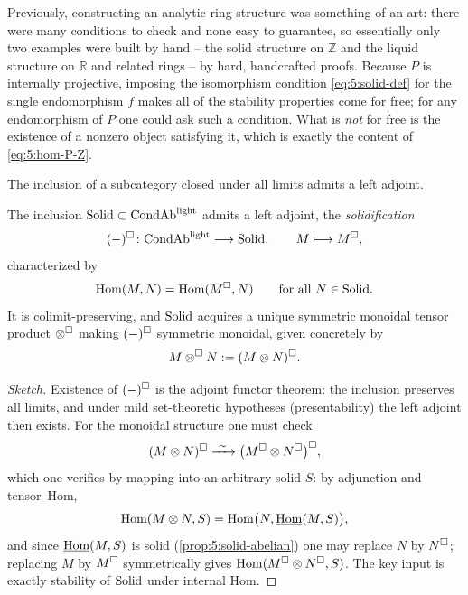 \begin{remark}
\label{rmk:5:for-free}
Previously, constructing an analytic ring structure was something of an art:
there were many conditions to check and none easy to guarantee, so essentially
only two examples were built by hand -- the solid structure on $\mathbb{Z}$ and
the liquid structure on $\mathbb{R}$ and related rings -- by hard, handcrafted
proofs. Because $P$ is internally projective, imposing the isomorphism condition
\eqref{eq:5:solid-def} for the single endomorphism $f$ makes all of the stability
properties come for free; for any endomorphism of $P$ one could ask such a
condition. What is \emph{not} for free is the existence of a nonzero object
satisfying it, which is exactly the content of \eqref{eq:5:hom-P-Z}.
\end{remark}

The inclusion of a subcategory closed under all limits admits a left adjoint.

\begin{corollary}[Solidification]
\label{cor:5:solidification}
The inclusion $\mathrm{Solid}\subset\mathrm{CondAb}^{\mathrm{light}}$ admits a left adjoint, the
\emph{solidification}
\begin{equation*}
(-)^{\square}\colon\mathrm{CondAb}^{\mathrm{light}}\longrightarrow\mathrm{Solid},\qquad M\longmapsto M^{\square},
\end{equation*}
characterized by
\begin{equation*}
\operatorname{Hom}(M,N)=\operatorname{Hom}(M^{\square},N)\qquad\text{for all }N\in\mathrm{Solid}.
\end{equation*}
It is colimit-preserving, and $\mathrm{Solid}$ acquires a unique symmetric monoidal tensor
product $\otimes^{\square}$ making $(-)^{\square}$ symmetric monoidal, given
concretely by
\begin{equation*}
M\otimes^{\square}N:=(M\otimes N)^{\square}.
\end{equation*}
\end{corollary}

\begin{proof}[Sketch]
Existence of $(-)^{\square}$ is the adjoint functor theorem: the inclusion
preserves all limits, and under mild set-theoretic hypotheses (presentability)
the left adjoint then exists. For the monoidal structure one must check
\begin{equation*}
(M\otimes N)^{\solid}\xrightarrow{\ \sim\ }\bigl(M^{\solid}\otimes N^{\solid}\bigr)^{\solid},
\end{equation*}
which one verifies by mapping into an arbitrary solid $S$: by adjunction and
tensor--Hom,
\[
\operatorname{Hom}(M\otimes N,S)=\operatorname{Hom}\bigl(N,\underline{\operatorname{Hom}}(M,S)\bigr),
\]
and since $\underline{\operatorname{Hom}}(M,S)$ is solid (\cref{prop:5:solid-abelian}) one may replace $N$
by $N^{\square}$; replacing $M$ by $M^{\square}$ symmetrically gives
$\operatorname{Hom}(M^{\square}\otimes N^{\square},S)$. The key input is exactly stability of
$\mathrm{Solid}$ under internal Hom.
\end{proof}

